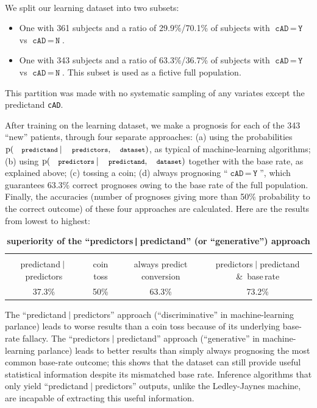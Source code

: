 \documentclass[utf8]{FrontiersinHarvard} %
\newcommand*{\amp}{\&}
\newcommand*{\mo}[1][=]{\mathord{\,#1\,}}
\newcommand*{\p}{\mathrm{p}}%
\renewcommand*{\|}[1][]{\nonscript\:#1\vert\nonscript\:\mathopen{}}
\newcommand*{\cad}{\texttt{cAD}}
\newcommand*{\yes}{\texttt{Y}}
\newcommand*{\no}{\texttt{N}}
\newcommand*{\predictors}{\texttt{\footnotesize predictors}}
\newcommand*{\predictand}{\texttt{\footnotesize predictand}}
\newcommand*{\dataset}{\texttt{\footnotesize dataset}}
\newcommand*{\ljm}{Ledley-Jaynes machine}
\begin{document}
\begin{table}[b]
  \begin{framed}
  \small
  \caption{\small\bf superiority of the \enquote{predictors$\pmb{\|}$predictand} (or \enquote{generative}) approach}
  \label{tab:superiority_predictors_given_predictand}
  \mbox{}\\
  We split our learning dataset into two subsets:
    \begin{itemize}
    \item One with 361 subjects and a ratio of 29.9\%/70.1\% of subjects with $\cad\mo\yes$ vs $\cad\mo\no$.
    \item One with 343 subjects and a ratio of 63.3\%/36.7\% of subjects with $\cad\mo\yes$ vs $\cad\mo\no$. This subset is used as a fictive full population.
    \end{itemize}
    This partition was made with no systematic sampling of any variates except the predictand \cad.

    \smallskip After training on the learning dataset, we make a prognosis for each of the 343 \enquote{new} patients, through four separate approaches: (a) using the probabilities $\p(\predictand \| \predictors, \dataset)$, as typical of machine-learning algorithms; (b) using $\p(\predictors \| \predictand, \dataset)$ together with the base rate, as explained above; (c) tossing a coin; (d) always prognosing \enquote{$\cad\mo\yes$}, which guarantees 63.3\% correct prognoses owing to the base rate of the full population. Finally, the accuracies (number of prognoses giving more than 50\% probability to the correct outcome) of these four approaches are calculated. Here are the results from lowest to highest:

    \medskip
    { 
      \centering
      \begin{tabular}{cccc}
        \hline\\[-\jot]
        {\scriptsize predictand$\|$predictors}&{\scriptsize coin toss}&{\scriptsize always predict conversion}&{\scriptsize predictors$\|$predictand \amp\ base\,rate}
        \\[1\jot]
        37.3\% & 50\% & 63.3\% & 73.2\%\\[\jot]
        \hline
      \end{tabular}

    }
    \medskip
    
    The \enquote{predictand$\|$predictors} approach (\enquote{discriminative} in machine-learning parlance) leads to worse results than a coin toss because of its underlying base-rate fallacy. The \enquote{predictors$\|$predictand} approach (\enquote{generative} in machine-learning parlance) leads to better results than simply always prognosing the most common base-rate outcome; this shows that the dataset can still provide useful statistical information despite its mismatched base rate. Inference algorithms that only yield \enquote{predictand$\|$predictors} outputs, unlike the \ljm, are incapable of extracting this useful information.
  \end{framed}
\end{table}
\end{document}
